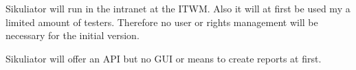 \documentclass[a4paper,twocolumn]{article}
\newcommand{\VMC}[0]{VMC®}
\begin{document}
Sikuliator will run in the intranet at the ITWM.
Also it will at first be used my a limited amount of testers.
Therefore no user or rights management will be necessary for the initial version.

Sikuliator will offer an API but no GUI or means to create reports at first.


%
%
%
%
%
%
%
\end{document}
